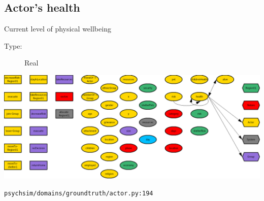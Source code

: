 \documentclass{article}%
\begin{document}
\subsection{Actor's health}%
\label{subsec:Actor's health}%
Current level of physical wellbeing%
\begin{description}%
\item[Type:]%
Real%
\end{description}%
\includegraphics[width=\textwidth]{images/healthOfActor.png}%
\begin{flushleft}%
\verb|psychsim/domains/groundtruth/actor.py:194|%
\end{flushleft}%
\end{document}
